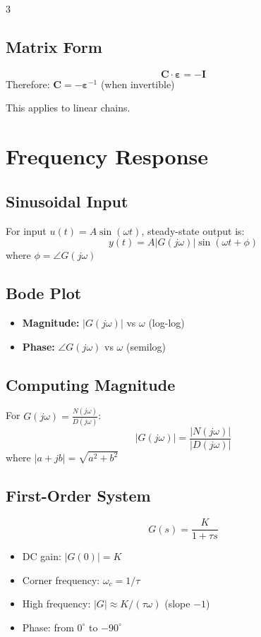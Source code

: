 \documentclass[10pt,landscape,letter]{article}
\begin{document}
\begin{multicols}{3}
\subsection{Matrix Form}
\begin{equation*}
\mathbf{C} \cdot \boldsymbol{\varepsilon} = -\mathbf{I}
\end{equation*}
Therefore: $\mathbf{C} = -\boldsymbol{\varepsilon}^{-1}$ (when invertible)

This applies to linear chains.
\section{Frequency Response}

\subsection{Sinusoidal Input}
For input $u(t) = A\sin(\omega t)$, steady-state output is:
\begin{equation*}
y(t) = A|G(j\omega)|\sin(\omega t + \phi)
\end{equation*}
where $\phi = \angle G(j\omega)$

\subsection{Bode Plot}
\begin{itemize}
\item \textbf{Magnitude:} $|G(j\omega)|$ vs $\omega$ (log-log)
\item \textbf{Phase:} $\angle G(j\omega)$ vs $\omega$ (semilog)
\end{itemize}

\subsection{Computing Magnitude}
For $G(j\omega) = \frac{N(j\omega)}{D(j\omega)}$:
\begin{equation*}
|G(j\omega)| = \frac{|N(j\omega)|}{|D(j\omega)|}
\end{equation*}
where $|a + jb| = \sqrt{a^2 + b^2}$

\subsection{First-Order System}
\begin{equation*}
G(s) = \frac{K}{1 + \tau s}
\end{equation*}
\begin{itemize}
\item DC gain: $|G(0)| = K$
\item Corner frequency: $\omega_c = 1/\tau$
\item High frequency: $|G| \approx K/(\tau\omega)$ (slope $-1$)
\item Phase: from $0^\circ$ to $-90^\circ$
\end{itemize}


\end{multicols}
\end{document}
